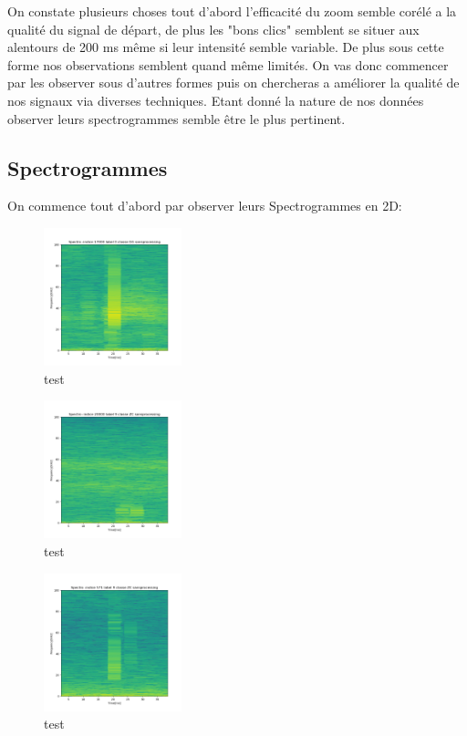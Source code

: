 On constate plusieurs choses tout d'abord l'efficacité du zoom semble corélé a la qualité du signal de départ, de plus les "bons clics" semblent se situer aux alentours de 200 ms même si leur intensité semble variable. De plus sous cette forme nos observations semblent quand même limités. On vas donc commencer par les observer sous d'autres formes puis on chercheras a améliorer la qualité de nos signaux via diverses techniques. Etant donné la nature de nos données observer leurs spectrogrammes semble être le plus pertinent.

\subsection{Spectrogrammes}

On commence tout d'abord par observer leurs Spectrogrammes en 2D:

\begin{figure}[!h]
\centering
\includegraphics[width=4cm]{./images/indice17000Spectro2Dlabel0classeGGsansprocessingsanszoom.png}
\caption{test}
\end{figure}


\begin{figure}[!h]
\centering
\includegraphics[width=4cm]{./images/indice20000Spectro2Dlabel9classeZCsansprocessingsanszoom.png}
\caption{test}
\end{figure}

\begin{figure}[!h]
\centering
\includegraphics[width=4cm]{./images/indice571Spectro2Dlabel9classeZCsansprocessingsanszoom.png}
\caption{test}
\end{figure}

